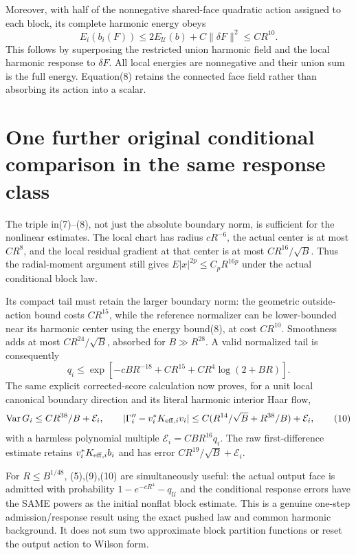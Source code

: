 \documentclass{article}
\begin{document}
Moreover, with half of the nonnegative shared-face quadratic action assigned to each block, its complete harmonic energy obeys
\[
 E_i(b_i(F))\le2E_{\mathcal U}(b)+C\|\delta F\|^2
                  \le CR^{10}.                     \tag{8}
\]
This follows by superposing the restricted union harmonic field and the local harmonic response to $\delta F$. All local energies are nonnegative and their union sum is the full energy. Equation(8) retains the connected face field rather than absorbing its action into a scalar.

\section*{One further original conditional comparison in the same response class}
The triple in(7)--(8), not just the absolute boundary norm, is sufficient for the nonlinear estimates. The local chart has radius $cR^{-6}$, the actual center is at most $CR^8$, and the local residual gradient at that center is at most $CR^{16}/\sqrt B$. Thus the radial-moment argument still gives $E|x|^{2p}\le C_pR^{16p}$ under the actual conditional block law.

Its compact tail must retain the larger boundary norm: the geometric outside-action bound costs $CR^{15}$, while the reference normalizer can be lower-bounded near its harmonic center using the energy bound(8), at cost $CR^{10}$. Smoothness adds at most $CR^{24}/\sqrt B$, absorbed for $B\gg R^{28}$. A valid normalized tail is consequently
\[
 q_i\le\exp[-cBR^{-18}+CR^{15}+CR^4\log(2+BR)].         \tag{9}
\]
The same explicit corrected-score calculation now proves, for a unit local canonical boundary direction and its literal harmonic interior Haar flow,
\[
 \operatorname{Var}G_i\le CR^{38}/B+\mathcal E_i,\qquad
 |\Gamma_i''-v_i^*K_{{\rm eff},i}v_i|
 \le C(R^{14}/\sqrt B+R^{38}/B)+\mathcal E_i,           \tag{10}
\]
with a harmless polynomial multiple $\mathcal E_i=CBR^{16}q_i$.
The raw first-difference estimate retains $v_i^*K_{{\rm eff},i}b_i$ and has error $CR^{19}/\sqrt B+\mathcal E_i$.

For $R\le B^{1/48}$, (5),(9),(10) are simultaneously useful: the actual output face is admitted with probability $1-e^{-cR^4}-q_{\mathcal U}$ and the conditional response errors have the SAME powers as the initial nonflat block estimate. This is a genuine one-step admission/response result using the exact pushed law and common harmonic background. It does not sum two approximate block partition functions or reset the output action to Wilson form.
\end{document}
